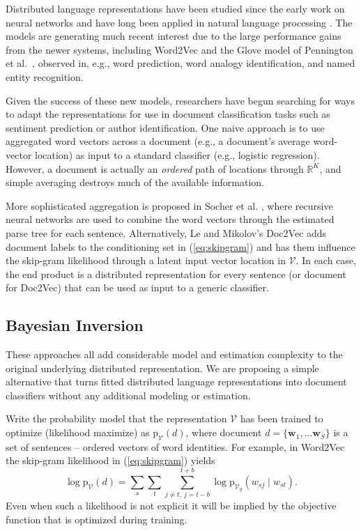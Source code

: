 \documentclass[11pt]{article}
\begin{document}
Distributed language representations have been studied since the early work on
neural networks \cite{rumelhart_learning_1986} and have long been applied in
natural language processing \cite{morin_hierarchical_2005}.  The models are
generating much recent interest due to the large performance gains from the
newer systems, including Word2Vec and the Glove model of Pennington et
al.~, observed in, e.g., word
prediction, word analogy identification, and named entity recognition.

Given the success of these new models, researchers have begun searching for
ways to adapt the representations for use in document classification tasks
such as sentiment prediction or author identification.  One  naive approach is
to use aggregated word vectors across a document (e.g., a document's average
word-vector location) as input to a standard classifier (e.g.,
logistic regression).  However, a document is actually  an {\it ordered} path
of  locations through $\mathds{R}^K$, and simple averaging destroys much of the available
information.  

More sophisticated aggregation is proposed in Socher et al.
, where recursive neural
networks are used to combine the word vectors through the estimated parse tree
for each sentence.  Alternatively,  Le and Mikolov's Doc2Vec
 adds document labels to the conditioning set
in (\ref{eq:skipgram}) and has them influence the skip-gram likelihood through
a latent input vector location in $\mathcal{V}$. In each case, the end product
is a distributed representation for every sentence (or document for Doc2Vec)
that can be used as input to a generic classifier.

\subsection{Bayesian Inversion}

These approaches all add considerable model and estimation complexity to the
original underlying distributed representation.  We are proposing a
simple alternative that turns fitted distributed language representations into
document classifiers without any additional modeling or estimation.  

Write the probability model that the representation $\mathcal{V}$ has been
trained to optimize (likelihood maximize) as $\mathrm{p}_{ \mathcal{V}}(d )$,
where document $d = \{\mathbf{w}_1, ... \mathbf{w}_S\}$ is a set of sentences 
-- ordered vectors of word identities.  
For example, in Word2Vec the skip-gram likelihood in
(\ref{eq:skipgram}) yields
\begin{equation}\label{eq:fulllhd}
\log\mathrm{p}_{ \mathcal{V}}(d) = \sum_s \sum_{t} \sum_{j\neq t,~j=t-b}^{t+b} 
\log\mathrm{p}_{ \mathcal{V}_y}(w_{sj}\mid w_{st} ).
\end{equation}
Even when such a likelihood is not explicit it will be implied by the objective function that is optimized during training.
\end{document}
